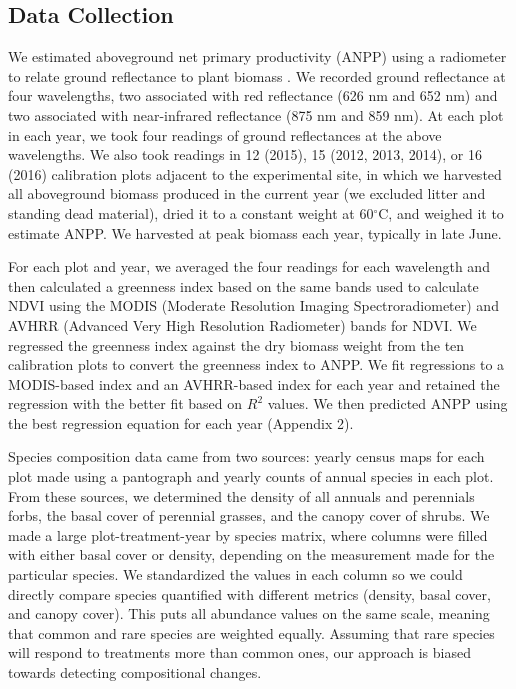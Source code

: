 \documentclass[fleqn,10pt,lineno]{wlpeerj} %
\begin{document}
\subsection{Data Collection}\label{data-collection}

We estimated aboveground net primary productivity (ANPP) using a
radiometer to relate ground reflectance to plant biomass \citep[see][
for a review]{Byrne2011}. We recorded ground reflectance at four
wavelengths, two associated with red reflectance (626 nm and 652 nm) and
two associated with near-infrared reflectance (875 nm and 859 nm). At
each plot in each year, we took four readings of ground reflectances at
the above wavelengths. We also took readings in 12 (2015), 15 (2012,
2013, 2014), or 16 (2016) calibration plots adjacent to the experimental
site, in which we harvested all aboveground biomass produced in the
current year (we excluded litter and standing dead material), dried it
to a constant weight at 60\(^{\circ}\)C, and weighed it to estimate
ANPP. We harvested at peak biomass each year, typically in late June.

For each plot and year, we averaged the four readings for each
wavelength and then calculated a greenness index based on the same bands
used to calculate NDVI using the MODIS (Moderate Resolution Imaging
Spectroradiometer) and AVHRR (Advanced Very High Resolution Radiometer)
bands for NDVI. We regressed the greenness index against the dry biomass
weight from the ten calibration plots to convert the greenness index to
ANPP. We fit regressions to a MODIS-based index and an AVHRR-based index
for each year and retained the regression with the better fit based on
\(R^2\) values. We then predicted ANPP using the best regression
equation for each year (Appendix 2).

Species composition data came from two sources: yearly census maps for
each plot made using a pantograph \citep{Hill1920} and yearly counts of
annual species in each plot.
From these sources, we determined the density of all annuals and
perennials forbs, the basal cover of perennial grasses, and the canopy
cover of shrubs. We made a large plot-treatment-year by species matrix,
where columns were filled with either basal cover or density, depending
on the measurement made for the particular species. We standardized the
values in each column so we could directly compare species quantified
with different metrics (density, basal cover, and canopy cover). This
puts all abundance values on the same scale, meaning that common and
rare species are weighted equally. Assuming that rare species will
respond to treatments more than common ones, our approach is biased
towards detecting compositional changes.
\end{document}
